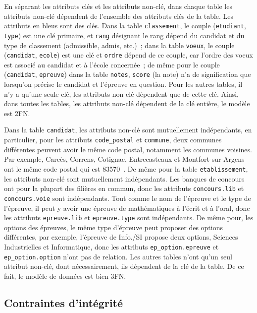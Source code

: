 \documentclass[12pt]{article}
\begin{document}
        En séparant les attributs clés et les attributs non-clé, dans chaque table les attributs non-clé dépendent de l'ensemble des attributs clés de la table. Les attributs en bleus sont des clés. Dans la table \texttt{classement}, le couple (\texttt{etudiant}, \texttt{type}) est une clé primaire, et \texttt{rang} désignant le rang dépend du candidat et du type de classement (admissible, admis, etc.)~; dans la table \texttt{voeux}, le couple (\texttt{candidat}, \texttt{ecole}) est une clé et \texttt{ordre} dépend de ce couple, car l'ordre des voeux est associé au candidat et à l'école concernée~; de même pour le couple (\texttt{candidat}, \texttt{epreuve}) dans la table \texttt{notes}, \texttt{score} (la note) n'a de signification que lorsqu'on précise le candidat et l'épreuve en question. Pour les autres tables, il n'y a qu'une seule clé, les attributs non-clé dépendent que de cette clé. Ainsi, dans toutes les tables, les attributs non-clé dépendent de la clé entière, le modèle est 2FN.
        
        Dans la table \texttt{candidat}, les attributs non-clé sont mutuellement indépendants, en particulier, pour les attributs \texttt{code\_postal} et \texttt{commune}, deux communes différentes peuvent avoir le même code postal, notamment les communes voisines. Par exemple, Carcès, Correns, Cotignac, Entrecasteaux et Montfort-sur-Argens ont le même code postal qui est 83570~\cite{cp}. De même pour la table \texttt{etablissement}, les attributs non-clé sont mutuellement indépendants. Les banques de concours ont pour la plupart des filières en commun, donc les attributs \texttt{concours.lib} et \texttt{concours.voie} sont indépendants. Tout comme le nom de l'épreuve et le type de l'épreuve, il peut y avoir une épreuve de mathématiques à l'écrit et à l'oral, donc les attributs \texttt{epreuve.lib} et \texttt{epreuve.type} sont indépendants. De même pour, les options des épreuves, le même type d'épreuve peut proposer des options différentes, par exemple, l'épreuve de Info./SI propose deux options, Sciences Industrielles et Informatique, donc les attributs \texttt{ep\_option.epreuve} et \texttt{ep\_option.option} n'ont pas de relation. Les autres tables n'ont qu'un seul attribut non-clé, dont nécessairement, ils dépendent de la clé de la table. De ce fait, le modèle de données est bien 3FN. 
        
    \subsection{Contraintes d'intégrité}
    
\end{document}
